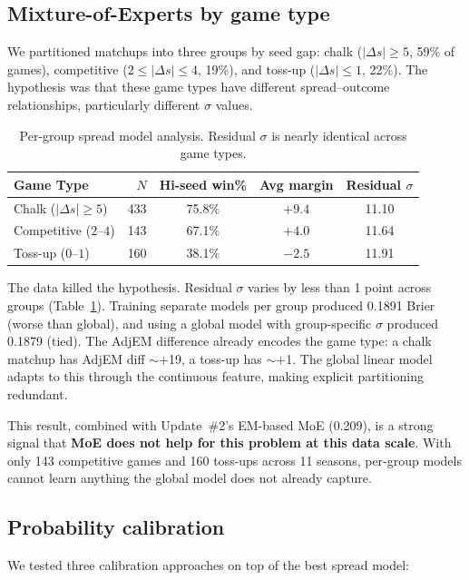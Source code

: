 \documentclass[11pt,a4paper]{article}
\begin{document}
\subsection{Mixture-of-Experts by game type}

We partitioned matchups into three groups by seed gap: chalk ($|\Delta s| \geq 5$, 59\% of games), competitive ($2 \leq |\Delta s| \leq 4$, 19\%), and toss-up ($|\Delta s| \leq 1$, 22\%). The hypothesis was that these game types have different spread--outcome relationships, particularly different $\sigma$ values.

\begin{table}[ht]
\centering
\caption{Per-group spread model analysis. Residual $\sigma$ is nearly identical across game types.}
\label{tab:moe}
\small
\begin{tabular}{@{}lrccc@{}}
\toprule
\textbf{Game Type} & $N$ & \textbf{Hi-seed win\%} & \textbf{Avg margin} & \textbf{Residual $\sigma$} \\
\midrule
Chalk ($|\Delta s| \geq 5$) & 433 & 75.8\% & $+9.4$ & 11.10 \\
Competitive ($2$--$4$) & 143 & 67.1\% & $+4.0$ & 11.64 \\
Toss-up ($0$--$1$) & 160 & 38.1\% & $-2.5$ & 11.91 \\
\bottomrule
\end{tabular}
\end{table}

The data killed the hypothesis. Residual $\sigma$ varies by less than 1 point across groups (Table~\ref{tab:moe}). Training separate models per group produced 0.1891 Brier (worse than global), and using a global model with group-specific $\sigma$ produced 0.1879 (tied). The AdjEM difference already encodes the game type: a chalk matchup has AdjEM diff $\sim$+19, a toss-up has $\sim$+1. The global linear model adapts to this through the continuous feature, making explicit partitioning redundant.

This result, combined with Update~\#2's EM-based MoE (0.209), is a strong signal that \textbf{MoE does not help for this problem at this data scale}. With only 143 competitive games and 160 toss-ups across 11 seasons, per-group models cannot learn anything the global model does not already capture.

\subsection{Probability calibration}

We tested three calibration approaches on top of the best spread model:
\end{document}
